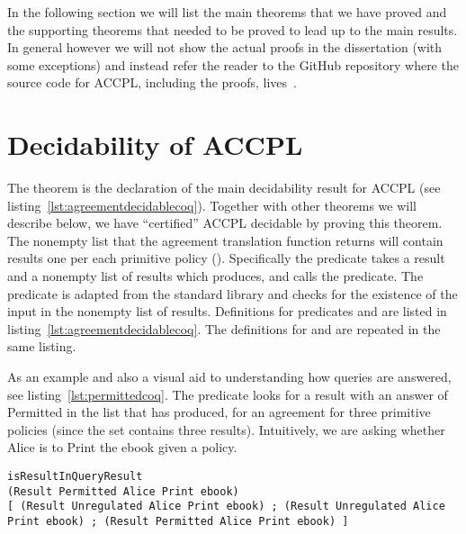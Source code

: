 In the following section we will list the main theorems that we have proved and the supporting theorems that needed to be proved to lead up to the main results. In general however we will not show the actual proofs in the dissertation (with some exceptions) and instead refer the reader to the GitHub repository where the source code for \ac{ACCPL}, including the proofs, lives~\cite{BahmanSistany2015}.

\section{Decidability of ACCPL}\label{sec:maintheorems}

The theorem  is the declaration of the main decidability result for \ac{ACCPL} (see listing~\ref{lst:agreementdecidablecoq}). Together with other theorems we will describe below, we have ``certified'' \ac{ACCPL} decidable by proving this theorem. The nonempty list that the agreement translation function  returns will contain results one per each primitive policy (). Specifically the predicate  takes a result and a nonempty list of results which  produces, and calls the  predicate. The  predicate is adapted from the  standard library and checks for the existence of the input  in the nonempty list of results. Definitions for predicates  and  are listed in listing~\ref{lst:agreementdecidablecoq}. The definitions for  and  are repeated in the same listing. 

As an example and also a visual aid to understanding how queries are answered, see listing~\ref{lst:permittedcoq}. The  predicate looks for a result with an answer of Permitted in the list that  has produced, for an agreement for three primitive policies (since the set contains three results). Intuitively, we are asking whether Alice is  to Print the ebook given a policy.  

\begin{lstlisting}
isResultInQueryResult
(Result Permitted Alice Print ebook) 
[ (Result Unregulated Alice Print ebook) ; (Result Unregulated Alice Print ebook) ; (Result Permitted Alice Print ebook) ]
\end{lstlisting}
    
